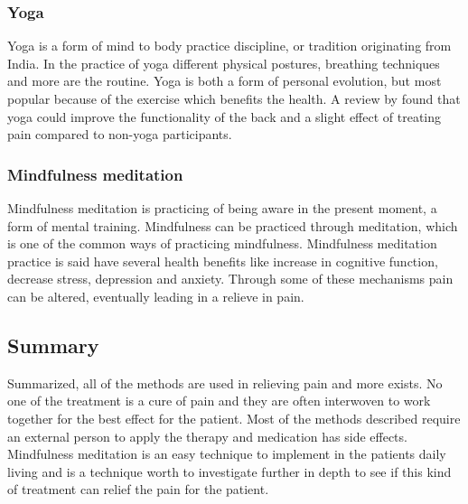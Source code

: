\subsubsection{Yoga}
Yoga is a form of mind to body practice discipline, or tradition originating from India. In the practice of yoga different physical postures, breathing techniques and more are the routine. 
Yoga is both a form of personal evolution, but most popular because of the exercise which benefits the health.
A review by \cite{Whitehead2017} found that yoga could improve the functionality of the back and a slight effect of treating pain compared to non-yoga participants. 

\subsubsection{Mindfulness meditation}
Mindfulness meditation is practicing of being aware in the present moment, a form of mental training. Mindfulness can be practiced through meditation, which is one of the common ways of practicing mindfulness. Mindfulness meditation practice is said have several health benefits like increase in cognitive function, decrease stress, depression and anxiety. Through some of these mechanisms pain can be altered, eventually leading in a relieve in pain. \cite{Zeidan2016} 

\subsection{Summary}
Summarized, all of the methods are used in relieving pain and more exists. No one of the treatment is a cure of pain and they are often interwoven to work together for the best effect for the patient. Most of the methods described require an external person to apply the therapy and medication has side effects. Mindfulness meditation is an easy technique to implement in the patients daily living and is a technique worth to investigate further in depth to see if this kind of treatment can relief the pain for the patient. 